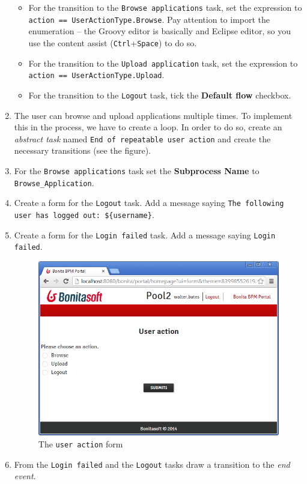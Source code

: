 \documentclass[]{report}
\let\Oldincludegraphics\includegraphics
\renewcommand{\includegraphics}[1]{
\begin{adjustbox}{max size={\textwidth}{\textheight}}
    \Oldincludegraphics[scale=0.6]{#1}%
\end{adjustbox}
}
\begin{document}
\begin{enumerate}
  \begin{itemize}
  \itemsep1pt\parskip0pt
  \item
    For the transition to the \texttt{Browse applications} task, set the
    expression to \texttt{action == UserActionType.Browse}. Pay
    attention to import the enumeration -- the Groovy editor is
    basically and Eclipse editor, so you use the content assist
    (\texttt{Ctrl}+\texttt{Space}) to do so.
  \item
    For the transition to the \texttt{Upload application} task, set the
    expression to \texttt{action == UserActionType.Upload}.
  \item
    For the transition to the \texttt{Logout} task, tick the
    \textbf{Default flow} checkbox.
  \end{itemize}
\item
  The user can browse and upload applications multiple times. To
  implement this in the process, we have to create a loop. In order to
  do so, create an \emph{abstract task} named
  \texttt{End of repeatable user action} and create the necessary
  transitions (see the figure).
\item
  For the \texttt{Browse applications} task set the \textbf{Subprocess
  Name} to \texttt{Browse\_Application}.
\item
  Create a form for the \texttt{Logout} task. Add a message saying
  \texttt{The following user has logged out: \$\{username\}}.
\item
  Create a form for the \texttt{Login failed} task. Add a message saying
  \texttt{Login failed}.

  \begin{figure}[htbp]
  \centering
  \includegraphics{img/bpmn/bonita_radio_buttons_web.png}
  \caption{The \texttt{user action} form}
  \end{figure}
\item
  From the \texttt{Login failed} and the \texttt{Logout} tasks draw a
  transition to the \emph{end event}.


\end{enumerate}
\end{document}
